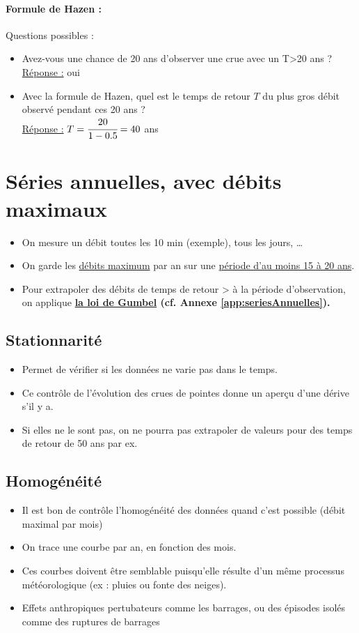 \paragraph{Formule de Hazen :} Questions possibles :
\begin{itemize}
    \item Avez-vous une chance de 20 ans d'observer une crue avec un T>20 ans ? \\
    \underline{Réponse :} oui 
    \item Avec la formule de Hazen, quel est le temps de retour $T$ du plus gros débit observé pendant ces 20 ans ? \\
    \underline{Réponse :} $T = \cfrac{20}{1-0.5} = 40$ ans
\end{itemize}

\section{Séries annuelles, avec débits maximaux}

\begin{itemize}
    \item On mesure un débit toutes les 10 min (exemple), tous les jours, \dots
    \item On garde les \underline{débits maximum} par an sur une \underline{période d'au moins 15 à 20 ans}.
    \item Pour extrapoler des débits de temps de retour > à la période d'observation, on applique \textbf{\underline{la loi de Gumbel} (cf. Annexe \ref{app:seriesAnnuelles}).}
\end{itemize}

\subsection{Stationnarité}
\begin{itemize}
    \item Permet de vérifier si les données ne varie pas dans le temps.
    \item Ce contrôle de l'évolution des crues de pointes donne un aperçu d'une dérive s'il y a.
    \item Si elles ne le sont pas, on ne pourra pas extrapoler de valeurs pour des temps de retour de 50 ans par ex.
\end{itemize}

\subsection{Homogénéité}
\begin{itemize}
    \item Il est bon de contrôle l'homogénéité des données quand c'est possible (débit maximal par mois)
    \item On trace une courbe par an, en fonction des mois.
    \item Ces courbes doivent être semblable puisqu'elle résulte d'un même processus météorologique (ex : pluies ou fonte des neiges).
    \item Effets anthropiques pertubateurs comme les barrages, ou des épisodes isolés comme des ruptures de barrages 
\end{itemize}

